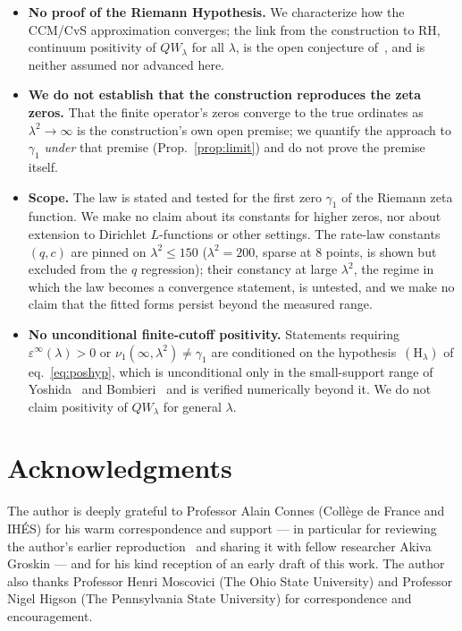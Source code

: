 \documentclass[11pt,a4paper]{article}
\begin{document}
\begin{itemize}
\item \textbf{No proof of the Riemann Hypothesis.} We characterize how the
  CCM/CvS approximation converges; the link from the construction to RH,
  continuum positivity of $QW_\lambda$ for all $\lambda$, is the open
  conjecture of~\cite{CCM2025,CvS2025,Connes2026}, and is neither assumed nor
  advanced here.
\item \textbf{We do not establish that the construction reproduces the zeta
  zeros.} That the finite operator's zeros converge to the true ordinates as
  $\lambda^2\to\infty$ is the construction's own open premise; we quantify the
  approach to $\gamma_1$ \emph{under} that premise (Prop.~\ref{prop:limit}) and
  do not prove the premise itself.
\item \textbf{Scope.} The law is stated and tested for the first zero $\gamma_1$
  of the Riemann zeta function. We make no claim about its constants for higher
  zeros, nor about extension to Dirichlet $L$-functions or other settings.
  The rate-law constants $(q,c)$ are pinned on $\lambda^2\le150$
  ($\lambda^2=200$, sparse at $8$ points, is shown but excluded from the $q$
  regression); their constancy at large $\lambda^2$, the regime in which the
  law becomes a convergence statement, is untested, and we make no claim
  that the fitted forms persist beyond the measured range.
\item \textbf{No unconditional finite-cutoff positivity.} Statements requiring
  $\varepsilon^\infty(\lambda)>0$ or $\nu_1(\infty,\lambda^2)\neq\gamma_1$ are
  conditioned on the hypothesis~$(\mathrm{H}_\lambda)$ of
  eq.~\eqref{eq:poshyp}, which is unconditional only in the small-support range
  of Yoshida~\cite{Yoshida1992} and Bombieri~\cite{Bombieri2000} and is
  verified numerically beyond it. We do not claim positivity of $QW_\lambda$
  for general $\lambda$.
\end{itemize}

\section*{Acknowledgments}
The author is deeply grateful to Professor Alain Connes (Coll\`ege de France
and IH\'ES) for his warm correspondence and support --- in particular for
reviewing the author's earlier reproduction~\cite{AndrewsA} and sharing it with
fellow researcher Akiva Groskin --- and for his kind reception of an early
draft of this work. The author also thanks Professor Henri Moscovici (The Ohio
State University) and Professor Nigel Higson (The Pennsylvania State
University) for correspondence and encouragement.
\end{document}
